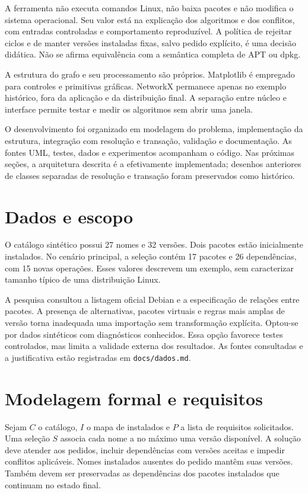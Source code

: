\documentclass[12pt]{article}
\begin{document}
A ferramenta não executa comandos Linux, não baixa pacotes e não modifica o sistema operacional. Seu valor está na explicação dos algoritmos e dos conflitos, com entradas controladas e comportamento reproduzível. A política de rejeitar ciclos e de manter versões instaladas fixas, salvo pedido explícito, é uma decisão didática. Não se afirma equivalência com a semântica completa de APT ou dpkg.

A estrutura do grafo e seu processamento são próprios. Matplotlib é empregado para controles e primitivas gráficas. NetworkX permanece apenas no exemplo histórico, fora da aplicação e da distribuição final. A separação entre núcleo e interface permite testar e medir os algoritmos sem abrir uma janela.

O desenvolvimento foi organizado em modelagem do problema, implementação da estrutura, integração com resolução e transação, validação e documentação. As fontes UML, testes, dados e experimentos acompanham o código. Nas próximas seções, a arquitetura descrita é a efetivamente implementada; desenhos anteriores de classes separadas de resolução e transação foram preservados como histórico.

\section{Dados e escopo}
O catálogo sintético possui 27 nomes e 32 versões. Dois pacotes estão inicialmente instalados. No cenário principal, a seleção contém 17 pacotes e 26 dependências, com 15 novas operações. Esses valores descrevem um exemplo, sem caracterizar tamanho típico de uma distribuição Linux.

A pesquisa consultou a listagem oficial Debian e a especificação de relações entre pacotes. A presença de alternativas, pacotes virtuais e regras mais amplas de versão torna inadequada uma importação sem transformação explícita. Optou-se por dados sintéticos com diagnósticos conhecidos. Essa opção favorece testes controlados, mas limita a validade externa dos resultados. As fontes consultadas e a justificativa estão registradas em \texttt{docs/dados.md}.

\clearpage
\section{Modelagem formal e requisitos}
Sejam $C$ o catálogo, $I$ o mapa de instalados e $P$ a lista de requisitos solicitados. Uma seleção $S$ associa cada nome a no máximo uma versão disponível. A solução deve atender aos pedidos, incluir dependências com versões aceitas e impedir conflitos aplicáveis. Nomes instalados ausentes do pedido mantêm suas versões. Também devem ser preservadas as dependências dos pacotes instalados que continuam no estado final.
\end{document}
